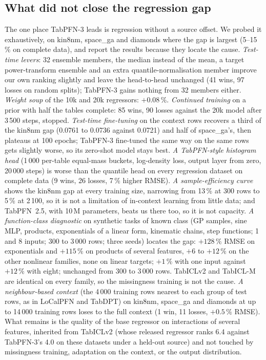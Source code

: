 \documentclass[11pt]{article}
\begin{document}
\FloatBarrier
\subsection{What did not close the regression gap}
\label{sec:negative}

The one place TabPFN-3 leads is regression without a source offset. We probed it
exhaustively, on kin8nm, space\_ga and diamonds where the gap is largest (5--15\,\% on
complete data), and report the results because they locate the cause.
\emph{Test-time levers}: 32 ensemble members, the median instead of the mean, a
target power-transform ensemble and an extra quantile-normalisation member improve our
own ranking slightly and leave the head-to-head unchanged (41 wins, 97 losses on random
splits); TabPFN-3 gains nothing from 32 members either. \emph{Weight soup} of the 10k
and 20k regressors: $+0.08\,\%$. \emph{Continued training} on a prior with half the
tables complete: 85 wins, 90 losses against the 20k model after 3\,500 steps, stopped.
\emph{Test-time fine-tuning} on the context rows recovers a third of the kin8nm gap
(0.0761 to 0.0736 against 0.0721) and half of space\_ga's, then plateaus at 100 epochs;
TabPFN-3 fine-tuned the same way on the same rows gets slightly worse, so its zero-shot
model stays best. \emph{A TabPFN-style histogram head} (1\,000 per-table equal-mass
buckets, log-density loss, output layer from zero, 20\,000 steps) is worse than the
quantile head on every regression dataset on complete data (9 wins, 26 losses, 7\,\%
higher RMSE). \emph{A sample-efficiency curve} shows the kin8nm gap at every training
size, narrowing from 13\,\% at 300 rows to 5\,\% at 2\,100, so it is not a limitation of
in-context learning from little data; and TabPFN~2.5, with 10\,M parameters, beats us
there too, so it is not capacity. \emph{A function-class diagnostic} on synthetic
tasks of known class (GP samples, sine MLP, products, exponentials of a linear form,
kinematic chains, step functions; 1 and 8 inputs; 300 to 3\,000 rows; three seeds)
locates the gap: $+128\,\%$ RMSE on exponentials and $+115\,\%$ on products of several
features, $+6$ to $+12\,\%$ on the other nonlinear families, none on linear targets;
$+1\,\%$ with one input against $+12\,\%$ with eight; unchanged from 300 to 3\,000 rows.
TabICLv2 and TabICL-M are identical on every family, so the missingness training is not
the cause. \emph{A neighbour-based context} (the 4\,000 training rows nearest to each
group of test rows, as in LoCalPFN and TabDPT) on kin8nm, space\_ga and diamonds at up to
14\,000 training rows loses to the full context (1 win, 11 losses, $+0.5\,\%$ RMSE).
What remains is the quality of the base regressor on interactions of several features, inherited from TabICLv2 (whose released regressor ranks
6.4 against TabPFN-3's 4.0 on these datasets under a held-out source) and not touched by
missingness training, adaptation on the context, or the output distribution.
\end{document}
